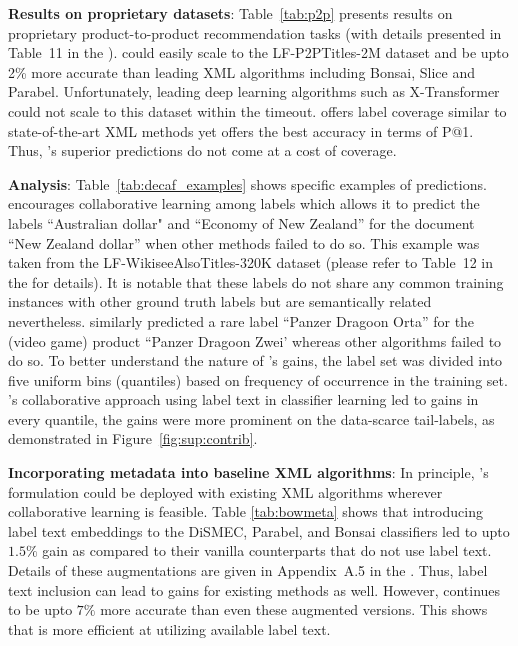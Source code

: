\textbf{Results on proprietary datasets}: Table~\ref{tab:p2p} presents results on proprietary product-to-product recommendation tasks (with details presented in Table~11 in the \suppl). \alg could easily scale to the LF-P2PTitles-2M dataset and be upto 2\% more accurate than leading XML algorithms including Bonsai, Slice and Parabel. Unfortunately, leading deep learning algorithms such as X-Transformer could not scale to this dataset within the timeout. \alg offers label coverage similar to state-of-the-art XML methods yet offers the best accuracy in terms of P@1. Thus, \alg's superior predictions do not come at a cost of coverage.



\textbf{Analysis}: Table~\ref{tab:decaf_examples} shows specific examples of \alg predictions. \alg encourages collaborative learning among labels which allows it to predict the labels ``Australian dollar" and ``Economy of New Zealand'' for the document ``New Zealand dollar'' when other methods failed to do so. This example was taken from the LF-WikiseeAlsoTitles-320K dataset (please refer to Table~12 in the \suppl for details). It is notable that these labels do not share any common training instances with other ground truth labels but are semantically related nevertheless. \alg similarly predicted a rare label ``Panzer Dragoon Orta'' for the (video game) product ``Panzer Dragoon Zwei' whereas other algorithms failed to do so. To better understand the nature of \alg's gains, the label set was divided into five uniform bins (quantiles) based on frequency of occurrence in the training set. \alg's collaborative approach using label text in classifier learning led to gains in every quantile, the gains were more prominent on the data-scarce tail-labels, as demonstrated in Figure~\ref{fig:sup:contrib}.

\textbf{Incorporating metadata into baseline XML algorithms}: In principle, \alg's formulation could be deployed with existing XML algorithms wherever collaborative learning is feasible. Table \ref{tab:bowmeta} shows that introducing label text embeddings to the DiSMEC, Parabel, and Bonsai classifiers led to upto $1.5\%$ gain as compared to their vanilla counterparts that do not use label text. Details of these augmentations are given in Appendix~A.5 in the \suppl. Thus, label text inclusion can lead to gains for existing methods as well. However, \alg continues to be upto $7\%$ more accurate than even these augmented versions. This shows that \alg is more efficient at utilizing available label text.

